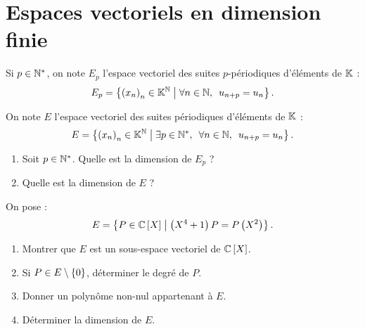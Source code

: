 \chapter{Espaces vectoriels en dimension finie}

\minitoc

\begin{exo}[Exercice 1]
Si \(p\in\mathbb{N}^*\), on note \(E_p\) l'espace vectoriel des suites \(p\)-périodiques d'éléments de \(\mathbb{K}\) : \[E_p=\accol{\paren{x_n}_n\in\K^\N\tq\quantifs{\forall n\in\N}u_{n+p}=u_n}.\]

On note \(E\) l'espace vectoriel des suites périodiques d'éléments de \(\mathbb{K}\) : \[E=\accol{\paren{x_n}_n\in\K^\N\tq\quantifs{\exists p\in\Ns;\forall n\in\N}u_{n+p}=u_n}.\]

\begin{enumerate}
\item Soit \(p\in\mathbb{N}^*\). Quelle est la dimension de \(E_p\) ? \\

\item Quelle est la dimension de \(E\) ?
\end{enumerate}
\end{exo}

\begin{corr}
\end{corr}

\begin{exo}
On pose : \[E=\accol{P\in\poly[\C]\tq\paren{X^4+1}P=P\paren{X^2}}.\]

\begin{enumerate}
\item Montrer que \(E\) est un sous-espace vectoriel de \(\poly[\C]\). \\

\item Si \(P\in E\setminus\left\lbrace0\right\rbrace\), déterminer le degré de \(P\). \\

\item Donner un polynôme non-nul appartenant à \(E\). \\

\item Déterminer la dimension de \(E\).
\end{enumerate}
\end{exo}

\begin{corr}
\end{corr}


